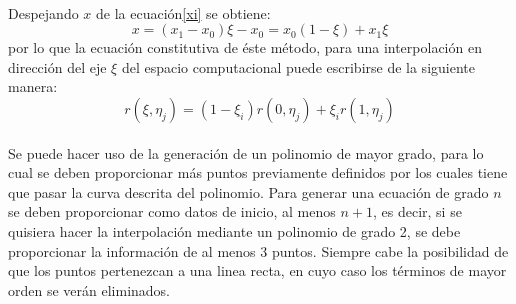 \documentclass[letterpaper, openright, 12pt]{book}
\begin{document}
    \paragraph*{}
    Despejando $x$ de la ecuación\ref{xi} se obtiene:
    \begin{equation}
        x = (x_{1} - x_{0})\xi - x_{0} = x_{0}(1 - \xi) + x_{1}\xi
    \end{equation}
    por lo que la ecuación constitutiva de éste método, para una
    interpolación en dirección del eje $\xi$ del espacio computacional puede
    escribirse de la siguiente manera:
    \begin{equation}
        r(\xi, \eta_{j}) = (1 - \xi_{i}) r(0, \eta_{j}) + \xi_{i}r(1, \eta_{j})
    \end{equation}

    \paragraph*{}
    Se puede hacer uso de la generación de un polinomio de mayor grado, para
    lo cual se deben proporcionar más puntos previamente definidos por los
    cuales tiene que pasar la curva descrita del polinomio. Para generar una
    ecuación de grado $n$ se deben proporcionar como datos de inicio, al
    menos $n+1$, es decir, si se quisiera hacer la interpolación mediante un
    polinomio de grado 2, se debe proporcionar la información de al menos 3
    puntos. Siempre cabe la posibilidad de que los puntos pertenezcan a una
    linea recta, en cuyo caso los términos de mayor orden se verán
    eliminados.
\end{document}
